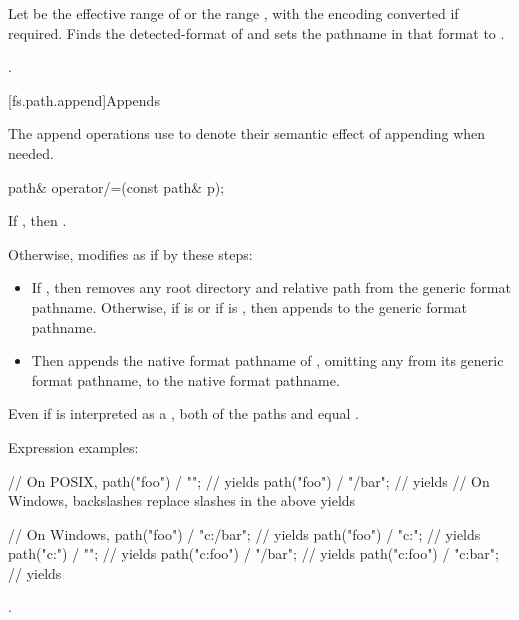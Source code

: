 \begin{itemdescr}
\pnum
\effects
Let  be the effective range of 
or the range , with the encoding converted if required.
Finds the detected-format of 
and sets the pathname in that format to .

\pnum
\returns {}.
\end{itemdescr}

[fs.path.append]{Appends}

\pnum
The append operations use  to denote their semantic effect of appending
 when needed.

%
\begin{itemdecl}
path& operator/=(const path& p);
\end{itemdecl}

\begin{itemdescr}
\pnum
\effects If ,
then .

\pnum
Otherwise, modifies  as if by these steps:
\begin{itemize}
\item If ,
  then removes any root directory and relative path
  from the generic format pathname.
  Otherwise,
  if  is 
  or if  is ,
  then appends  to the generic format pathname.
\item Then appends the native format pathname of ,
  omitting any  from its generic format pathname,
  to the native format pathname.
\end{itemize}

\pnum
\begin{example}
Even if  is interpreted as a ,
both of the paths  and 
equal .

Expression examples:
\begin{codeblock}
// On POSIX,
path("foo") / "";     // yields 
path("foo") / "/bar"; // yields 
// On Windows, backslashes replace slashes in the above yields

// On Windows,
path("foo") / "c:/bar";  // yields 
path("foo") / "c:";      // yields 
path("c:") / "";         // yields 
path("c:foo") / "/bar";  // yields 
path("c:foo") / "c:bar"; // yields 
\end{codeblock}
\end{example}

\pnum
\returns {}.
\end{itemdescr}

